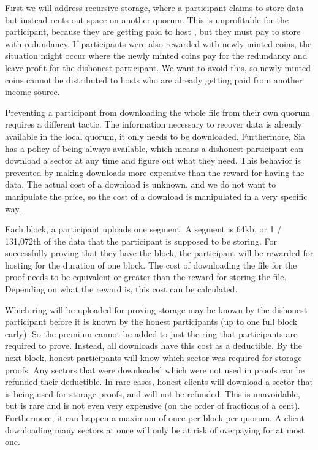 \documentclass[twocolumn]{article}
\begin{document}
First we will address recursive storage, where a participant claims to store data but instead rents out space on another quorum.
This is unprofitable for the participant, because they are getting paid to host \participantvolume{}, but they must pay to store \participantvolume{} with redundancy.
If participants were also rewarded with newly minted coins, the situation might occur where the newly minted coins pay for the redundancy and leave profit for the dishonest participant.
We want to avoid this, so newly minted coins cannot be distributed to hosts who are already getting paid from another income source.

Preventing a participant from downloading the whole file from their own quorum requires a different tactic.
The information necessary to recover data is already available in the local quorum, it only needs to be downloaded.
Furthermore, Sia has a policy of being always available, which means a dishonest participant can download a sector at any time and figure out what they need.
This behavior is prevented by making downloads more expensive than the reward for having the data.
The actual cost of a download is unknown, and we do not want to manipulate the price, so the cost of a download is manipulated in a very specific way.

Each block, a participant uploads one segment.
A segment is 64kb, or 1 / 131,072th of the data that the participant is supposed to be storing.
For successfully proving that they have the block, the participant will be rewarded for hosting \participantvolume{} for the duration of one block.
The cost of downloading the file for the proof needs to be equivalent or greater than the reward for storing the file.
Depending on what the reward is, this cost can be calculated.

Which ring will be uploaded for proving storage may be known by the dishonest participant before it is known by the honest participants (up to one full block early).
So the premium cannot be added to just the ring that participants are required to prove.
Instead, all downloads have this cost as a deductible.
By the next block, honest participants will know which sector was required for storage proofs.
Any sectors that were downloaded which were not used in proofs can be refunded their deductible.
In rare cases, honest clients will download a sector that is being used for storage proofs, and will not be refunded.
This is unavoidable, but is rare and is not even very expensive (on the order of fractions of a cent).
Furthermore, it can happen a maximum of once per block per quorum.
A client downloading many sectors at once will only be at risk of overpaying for at most one.
\end{document}
